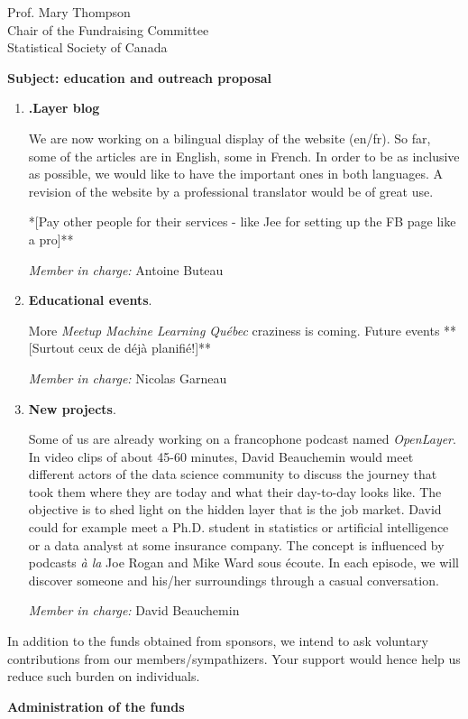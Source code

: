 \documentclass[11pt, a4paper]{letter} %
\begin{document}
\begin{letter}{
	Prof. Mary Thompson\\
	Chair of the Fundraising Committee\\
	Statistical Society of Canada
	
	\bigskip
	\textbf{Subject: education and outreach proposal}%
}
\begin{enumerate}
	\bigskip
	\emph{Member in charge:} Stéphane Caron\\
	
	\item \textbf{.Layer blog}
	
	\quad We are now working on a bilingual display of the website (en/fr). So far, some of the articles are in English, some in French. In order to be as inclusive as possible, we would like to have the important ones in both languages. A revision of the website by a professional translator would be of great use. 
	
	\quad **[Pay other people for their services - like Jee for setting up the FB page like a pro]**
	
	\bigskip
	\emph{Member in charge:} Antoine Buteau\\
	
	\item \textbf{Educational events}.
	
	\quad More \emph{Meetup Machine Learning Québec} craziness is coming. Future events **[Surtout ceux de déjà planifié!]**
			
	\bigskip
	\emph{Member in charge:} Nicolas Garneau\\
	
	\item \textbf{New projects}.
	
	\quad Some of us are already working on a francophone podcast named \emph{OpenLayer}. In video clips of about 45-60 minutes, David Beauchemin would meet different actors of the data science community to discuss the journey that took them where they are today and what their day-to-day looks like. The objective is to shed light on the hidden layer that is the job market. David could for example meet a Ph.D. student in statistics or artificial intelligence or a data analyst at some insurance company. The concept is influenced by podcasts \emph{à la} Joe Rogan and Mike Ward sous écoute. In each episode, we will discover someone and his/her surroundings through a casual conversation.
	
	\bigskip
	\emph{Member in charge:} David Beauchemin
\end{enumerate}

In addition to the funds obtained from sponsors, we intend to ask voluntary contributions from our members/sympathizers. Your support would hence help us reduce such burden on individuals.


\bigskip
\noindent \textbf{Administration of the funds}


\end{letter}
\end{document}
